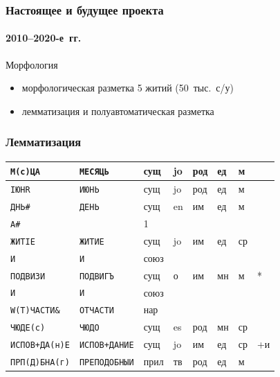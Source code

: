 \documentclass[xetex, aspectratio=169, russian]{beamer}
\begin{document}
\begin{frame}
  \frametitle{Настоящее и будущее проекта}
  \framesubtitle{2010--2020-е~гг.}

  \begin{block}{Морфология}
    \begin{itemize}
      \item морфологическая разметка 5 житий (50~тыс.\ с/у)
      \item лемматизация и полуавтоматическая разметка\autocite{sipunin:2020}
    \end{itemize}
  \end{block}
\end{frame}

\begin{frame}
  \frametitle{Лемматизация}

  \footnotesize \setlength{\aboverulesep}{0.5pt} \setlength{\belowrulesep}{0.5pt}
  \begin{tabularx}{\textwidth}{XXp{0.75cm}p{0.75cm}p{0.75cm}p{0.75cm}p{0.75cm}p{0.75cm}}
    \toprule
    \texttt{М(с)ЦА} & \texttt{МЕСЯЦЬ}                & сущ  & jo & род & ед & м  &    \\ \midrule
    \texttt{IЮНR} & \texttt{ИЮНЬ}                    & сущ  & jo & род & ед & м  &    \\ \midrule
    \texttt{ДНЬ\#} & \texttt{ДЕНЬ}                   & сущ  & en & им  & ед & м  &    \\ \midrule
    \texttt{А\#} &                                   & 1    &    &     &    &    &    \\ \midrule
    \texttt{ЖИТIЕ} & \texttt{ЖИТИЕ}                  & сущ  & jo & им  & ед & ср &    \\ \midrule
    \texttt{И} & \texttt{И}                          & союз &    &     &    &    &    \\ \midrule
    \texttt{ПОДВИЗИ} & \texttt{ПОДВИГЪ}              & сущ  & о  & им  & мн & м  & *  \\ \midrule
    \texttt{И} & \texttt{И}                          & союз &    &     &    &    &    \\ \midrule
    \texttt{W(Т)ЧАСТИ\&} & \texttt{ОТЧАСТИ}          & нар  &    &     &    &    &    \\ \midrule
    \texttt{ЧЮДЕ(с)} & \texttt{ЧЮДО}                 & сущ  & es & род & мн & ср &    \\ \midrule
    \texttt{ИСПОВ+ДА(н)Е} & \texttt{ИСПОВ+ДАНИЕ}     & сущ  & jo & им  & ед & ср & +и \\ \midrule
    \texttt{ПРП(Д)БНА(г)} & \texttt{ПРЕПОДОБНЫИ}     & прил & тв & род & ед & м  &    \\ \midrule

\end{tabularx}
\end{frame}
\end{document}
